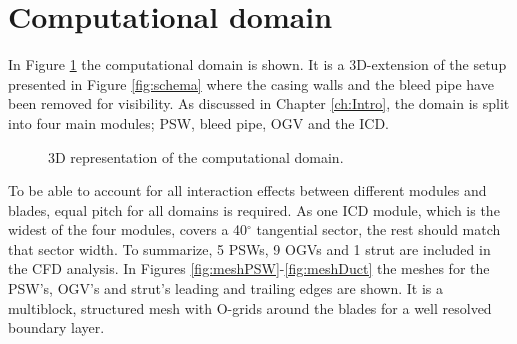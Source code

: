 \section{Computational domain}
In Figure \ref{fig:rig} the computational domain is shown. It is a 3D-extension of the setup presented in Figure \ref{fig:schema} where the casing walls and the bleed pipe have been removed for visibility. As discussed in Chapter \ref{ch:Intro}, the domain is split into four main modules; PSW, bleed pipe, OGV and the ICD.
\begin{figure}[H]
  \centering
  \caption{3D representation of the computational domain.}\label{fig:rig}
\end{figure}

To be able to account for all interaction effects between different modules and blades, equal pitch for all domains is required. As one ICD module, which is the widest of the four modules, covers a 40$^{\circ}$ tangential sector, the rest should match that sector width. To summarize, 5 PSWs, 9 OGVs and 1 strut are included in the CFD analysis. In Figures \ref{fig:meshPSW}-\ref{fig:meshDuct} the meshes for the PSW's, OGV's and strut's leading and trailing edges are shown. It is a multiblock, structured mesh with O-grids around the blades for a well resolved boundary layer.

